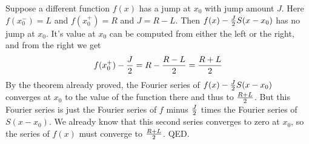 \documentclass[11pt, oneside]{amsart}
\begin{document}
Suppose a different function $f(x)$ has a jump at $x_0$ with jump amount $J$. Here $f(x_0^-) = L$ and
$f(x_0^+) = R$ and $J = R - L$. Then $f(x) - {J \over 2} S(x - x_0)$ has no jump at $x_0$. It's value at $x_0$
can be computed from either the left or the right, and from the right we get $$f(x_0^+) - {J \over 2} = R - {{R - L} \over 2} = {{R + L} \over 2}$$
By the theorem already proved, the Fourier series of $f(x) - {J \over 2} S(x - x_0)$ converges at $x_0$ to the value of the function there and thus to ${{R + L} \over 2}$. But this Fourier series is just the Fourier series of $f$ minus ${J \over 2}$ times the Fourier series of $S(x - x_0)$. We already know that this second series converges to zero at $x_0$,  so the series of $f(x)$ must converge to ${{R + L} \over 2}$. QED. 
\end{document}
